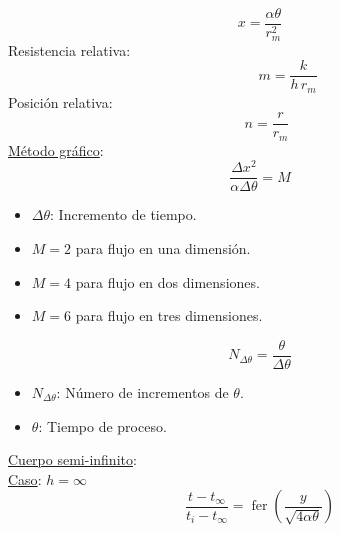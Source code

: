 \documentclass[letter,oneside,10pt]{article}
\DeclareMathOperator{\fer}{fer}
\begin{document}
\begin{multicols}{3}
\begin{equation*}
    x = \frac{\alpha\theta}{r_m^2}
\end{equation*}
\vspace{-0.3cm}
Resistencia relativa:
\vspace{-0.4cm}
\begin{equation*}
    \quad\quad\quad\quad m = \frac{k}{h\,r_m}
\end{equation*}
\vspace{-0.3cm}
Posición relativa:
\vspace{-0.4cm}
\begin{equation*}
    \quad n = \frac{r}{r_m}
\end{equation*}
\vspace{-0.3cm}
\underline{Método gráfico}:
\vspace{-0.4cm}
\begin{equation*}
    \frac{\Delta x^2}{\alpha\Delta\theta}=M
\end{equation*}
\vspace{-0.3cm}
\tiny
\begin{itemize}
    \item $\Delta\theta$: Incremento de tiempo.
    \item $M=2$ para flujo en una dimensión.
    \item $M=4$ para flujo en dos dimensiones.
    \item $M=6$ para flujo en tres dimensiones.
\end{itemize}
\vspace{-0.2cm}
\scriptsize
\begin{equation*}
    N_{\Delta\theta}=\frac{\theta}{\Delta\theta}
\end{equation*}
\vspace{-0.3cm}
\tiny
\begin{itemize}
    \item $N_{\Delta\theta}$: Número de incrementos de $\theta$.
    \item $\theta$: Tiempo de proceso.
\end{itemize}
\scriptsize
\underline{Cuerpo semi-infinito}:\\
\underline{Caso}: $h=\infty$
\vspace{-0.3cm}
\begin{equation*}
    \frac{t-t_\infty}{t_i-t_\infty} = \fer\left(
        \frac{y}{\sqrt{4\alpha\theta}}
    \right)
\end{equation*}
\vspace{-0.3cm}
\tiny
\begin{itemize}

\end{itemize}
\end{multicols}
\end{document}

